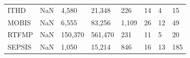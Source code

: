 \begin{tabular}{lrllllll}
      ITHD &          NaN &    4,580 &    21,348 &         226 &            14 &                   4 &               15 \\
     MOBIS &          NaN &    6,555 &    83,256 &       1,109 &            26 &                  12 &               49 \\
     RTFMP &          NaN &  150,370 &   561,470 &         231 &            11 &                   5 &               20 \\
    SEPSIS &          NaN &    1,050 &    15,214 &         846 &            16 &                  13 &              185 \\
\bottomrule
\end{tabular}
